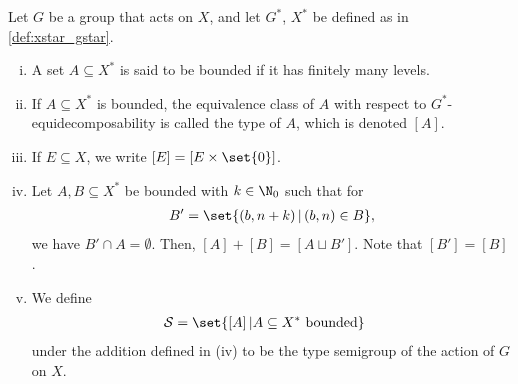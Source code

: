 \begin{definition}
  Let $G$ be a group that acts on $X$, and let $G^{\ast}$, $X^{\ast}$ be defined as in \ref{def:xstar_gstar}.
  \begin{enumerate}[(i)]
    \item A set $A\subseteq X^{\ast}$ is said to be {bounded} if it has finitely many levels.
    \item If $A\subseteq X^{\ast}$ is bounded, the equivalence class of $A$ with respect to $G^{\ast}$-equidecomposability is called the {type} of $A$, which is denoted $\left[A\right]$.
    \item If $E\subseteq X$, we write $\left[E\right] = \left[E\times \set{0}\right]$.
    \item Let $A,B\subseteq X^{\ast}$ be bounded with $k\in \N_{0}$ such that for
      \begin{align*}
        B'= \set{\left(b,n+k\right)| \left(b,n\right)\in B},
      \end{align*}
      we have $B'\cap A = \emptyset$. Then, $\left[A\right] + \left[B\right] = \left[A\sqcup B'\right]$. Note that $\left[B'\right] = \left[B\right]$.
    \item We define
      \begin{align*}
        \mathcal{S} &= \set{\left[A\right]| A\subseteq X^{\ast}\text{ bounded}}
      \end{align*}
      under the addition defined in (iv) to be the {type semigroup} of the action of $G$ on $X$.
  \end{enumerate}\label{def:type_semigroup}
\end{definition}

